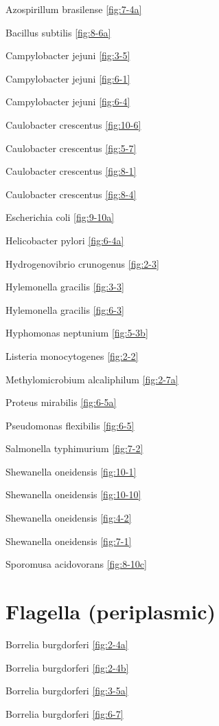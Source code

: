\documentclass[]{tufte-book}
\begin{document}
Azospirillum brasilense \ref{fig:7-4a}

Bacillus subtilis \ref{fig:8-6a}

Campylobacter jejuni \ref{fig:3-5}

Campylobacter jejuni \ref{fig:6-1}

Campylobacter jejuni \ref{fig:6-4}

Caulobacter crescentus \ref{fig:10-6}

Caulobacter crescentus \ref{fig:5-7}

Caulobacter crescentus \ref{fig:8-1}

Caulobacter crescentus \ref{fig:8-4}

Escherichia coli \ref{fig:9-10a}

Helicobacter pylori \ref{fig:6-4a}

Hydrogenovibrio crunogenus \ref{fig:2-3}

Hylemonella gracilis \ref{fig:3-3}

Hylemonella gracilis \ref{fig:6-3}

Hyphomonas neptunium \ref{fig:5-3b}

Listeria monocytogenes \ref{fig:2-2}

Methylomicrobium alcaliphilum \ref{fig:2-7a}

Proteus mirabilis \ref{fig:6-5a}

Pseudomonas flexibilis \ref{fig:6-5}

Salmonella typhimurium \ref{fig:7-2}

Shewanella oneidensis \ref{fig:10-1}

Shewanella oneidensis \ref{fig:10-10}

Shewanella oneidensis \ref{fig:4-2}

Shewanella oneidensis \ref{fig:7-1}

Sporomusa acidovorans \ref{fig:8-10c}

\hypertarget{flagella-periplasmic}{%
\section*{Flagella (periplasmic)}\label{flagella-periplasmic}}

Borrelia burgdorferi \ref{fig:2-4a}

Borrelia burgdorferi \ref{fig:2-4b}

Borrelia burgdorferi \ref{fig:3-5a}

Borrelia burgdorferi \ref{fig:6-7}
\end{document}
